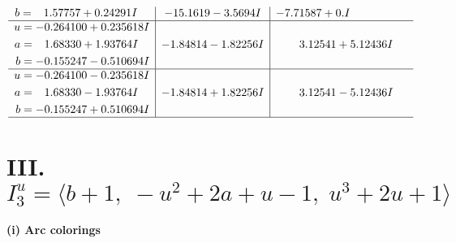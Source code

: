 \documentclass[1p]{elsarticle_modified}
\theoremstyle{definition}
\begin{document}
$$\begin{array}{c|c|c}
\begin{aligned}
b &= \phantom{-}1.57757 + 0.24291 I\end{aligned}
 & -15.1619 - 3.5694 I & -7.71587 + 0. I\phantom{ +0.000000I} \\ \hline\begin{aligned}
u &= -0.264100 + 0.235618 I \\
a &= \phantom{-}1.68330 + 1.93764 I \\
b &= -0.155247 - 0.510694 I\end{aligned}
 & -1.84814 - 1.82256 I & \phantom{-}3.12541 + 5.12436 I \\ \hline\begin{aligned}
u &= -0.264100 - 0.235618 I \\
a &= \phantom{-}1.68330 - 1.93764 I \\
b &= -0.155247 + 0.510694 I\end{aligned}
 & -1.84814 + 1.82256 I & \phantom{-}3.12541 - 5.12436 I\\
 \hline 
 \end{array}$$\newpage\newpage\renewcommand{\arraystretch}{1}
\centering \section*{III. $I^u_{3}= \langle b+1,\;- u^2+2 a+u-1,\;u^3+2 u+1 \rangle$}
\flushleft \textbf{(i) Arc colorings}\\
\end{document}
